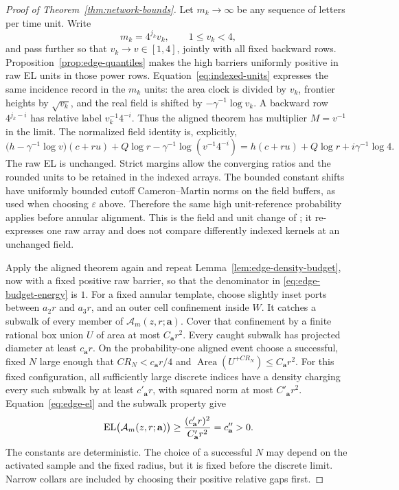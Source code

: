 \begin{proof}[Proof of Theorem~\ref{thm:network-bounds}]
Let \(m_k\to\infty\) be any sequence of letters per time unit.  Write
\[
 m_k=4^{j_k}v_k,\qquad 1\le v_k<4,
\]
and pass further so that \(v_k\to v\in[1,4]\), jointly with all fixed
backward rows.  Proposition~\ref{prop:edge-quantiles} makes the high
barriers uniformly positive in raw EL units in those power rows.
Equation~\eqref{eq:indexed-units} expresses the same incidence record in
the \(m_k\) units: the area clock is divided by \(v_k\), frontier heights
by \(\sqrt{v_k}\), and the real field is shifted by
\(-\gamma^{-1}\log v_k\).  A backward row \(4^{j_k-i}\) has relative label
\(v_k^{-1}4^{-i}\).  Thus the aligned theorem has multiplier \(M=v^{-1}\)
in the limit.  The normalized field identity is, explicitly,
\[
 \bigl(h-\gamma^{-1}\log v\bigr)(c+ru)+Q\log r
       -\gamma^{-1}\log(v^{-1}4^{-i})
 =h(c+ru)+Q\log r+i\gamma^{-1}\log4.
\]
The raw EL is unchanged.  Strict margins allow the converging ratios and
the rounded units to be retained in the indexed arrays.  The bounded
constant shifts have uniformly bounded cutoff Cameron--Martin norms on
the field buffers, as used when choosing \(\varepsilon\) above.  Therefore
the same high unit-reference probability applies before annular alignment.
This is the field and unit change of \cite[Proposition~5.12]{C}; it
re-expresses one raw array and does not compare differently indexed
kernels at an unchanged field.

Apply the aligned theorem again and repeat
Lemma~\ref{lem:edge-density-budget}, now with a fixed positive raw barrier,
so that the denominator in \eqref{eq:edge-budget-energy} is \(1\).
For a fixed annular template, choose slightly inset ports between
\(a_2r\) and \(a_3r\), and an outer cell confinement inside \(W\).
It catches a subwalk of every member of
\(\mathcal A_m(z,r;\mathbf a)\).  Cover that confinement by a finite
rational box union \(U\) of area at most \(C_{\mathbf a}r^2\).  Every
caught subwalk has projected diameter at least \(c_{\mathbf a}r\).
On the probability-one aligned event choose a successful, fixed \(N\)
large enough that \(CR_N<c_{\mathbf a}r/4\) and
\(\operatorname{Area}(U^{+CR_N})\le C_{\mathbf a}r^2\).  For this fixed
configuration, all sufficiently large discrete indices have a density
charging every such subwalk by at least \(c'_{\mathbf a}r\), with squared
norm at most \(C'_{\mathbf a}r^2\).  Equation~\eqref{eq:edge-el} and the
subwalk property give
\[
 \operatorname{EL}\bigl(\mathcal A_m(z,r;\mathbf a)\bigr)
 \ge\frac{(c'_{\mathbf a}r)^2}{C'_{\mathbf a}r^2}
 =c''_{\mathbf a}>0.
\]
The constants are deterministic.  The choice of a successful \(N\) may
depend on the activated sample and the fixed radius, but it is fixed before
the discrete limit.  Narrow collars are included by choosing their
positive relative gaps first.


\end{proof}
